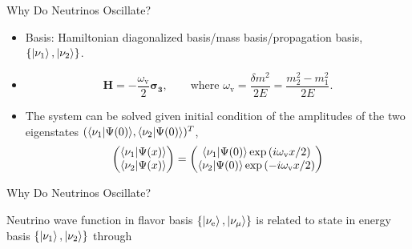 \documentclass[9pt]{beamer}
\begin{document}
\begin{darkframes}
\begin{frame}[fragile]{Why Do Neutrinos Oscillate?}
\begin{tcolorbox}[title=Equation of Motion]
\end{tcolorbox}




\begin{itemize}
\item Basis: Hamiltonian diagonalized basis/mass basis/propagation basis, $\{ \left| \nu_1\right\rangle, \left| \nu_2\right\rangle\}$.

\item
\begin{equation*}
    \mathbf H = - \frac{\omega_\mathrm v}{2}\boldsymbol{\sigma_3}, \qquad \text{where } \omega_{\mathrm v} = \frac{\delta m^2}{2E}=\frac{m_2^2 - m_1^2}{2E} .
\end{equation*}



\item The system can be solved given initial condition of the amplitudes of the two eigenstates $(\langle \nu_1 | \Psi(0) \rangle,\langle \nu_2 | \Psi(0) \rangle )^T$,
\begin{equation*}
    \begin{pmatrix}
    \langle \nu_1 | \Psi(x) \rangle \\
    \langle \nu_2 | \Psi(x) \rangle
    \end{pmatrix} = \begin{pmatrix}
    \langle \nu_1 | \Psi(0) \rangle \exp\left( i  \omega_{\mathrm v} x /2 \right) \\
    \langle \nu_2 | \Psi(0) \rangle \exp\left( -i  \omega_{\mathrm v} x/2 \right)
    \end{pmatrix}
\end{equation*}


\end{itemize}




\end{frame}



\begin{frame}[fragile]{Why Do Neutrinos Oscillate?}

\begin{tcolorbox}[title=Flavor basis]


Neutrino wave function in flavor basis $\{\left| \nu_{\mathrm e}\right\rangle, \left| \nu_{\mathrm \mu}\right\rangle \}$ is related to state in energy basis $\{\left| \nu_1\right\rangle,\left| \nu_2\right\rangle \}$ through


\end{tcolorbox}
\end{frame}
\end{darkframes}
\end{document}
